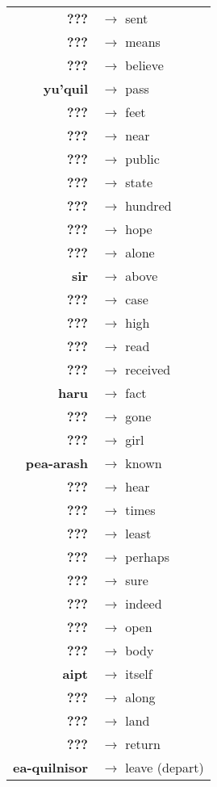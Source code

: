 \begin{tabular}{rl}
\textbf{???} & $\rightarrow$ sent \\
\textbf{???} & $\rightarrow$ means \\
\textbf{???} & $\rightarrow$ believe \\
\textbf{yu'quil}  & $\rightarrow$ pass \\
\textbf{???} & $\rightarrow$ feet \\
\textbf{???} & $\rightarrow$ near \\
\textbf{???} & $\rightarrow$ public \\
\textbf{???} & $\rightarrow$ state \\
\textbf{???} & $\rightarrow$ hundred \\
\textbf{???} & $\rightarrow$ hope \\
\textbf{???} & $\rightarrow$ alone \\
\textbf{sir} & $\rightarrow$ above \\
\textbf{???} & $\rightarrow$ case \\
\textbf{???} & $\rightarrow$ high \\
\textbf{???} & $\rightarrow$ read \\
\textbf{???} & $\rightarrow$ received \\
\textbf{haru} & $\rightarrow$ fact \\
\textbf{???} & $\rightarrow$ gone \\
\textbf{???} & $\rightarrow$ girl \\
\textbf{pea-arash} & $\rightarrow$ known \\
\textbf{???} & $\rightarrow$ hear \\
\textbf{???} & $\rightarrow$ times \\
\textbf{???} & $\rightarrow$ least \\
\textbf{???} & $\rightarrow$ perhaps \\
\textbf{???} & $\rightarrow$ sure \\
\textbf{???} & $\rightarrow$ indeed \\
\textbf{???} & $\rightarrow$ open \\
\textbf{???} & $\rightarrow$ body \\
\textbf{aipt} & $\rightarrow$ itself \\
\textbf{???} & $\rightarrow$ along \\
\textbf{???} & $\rightarrow$ land \\
\textbf{???} & $\rightarrow$ return \\
\textbf{ea-quilnisor} & $\rightarrow$ leave (depart) \\

\end{tabular}
